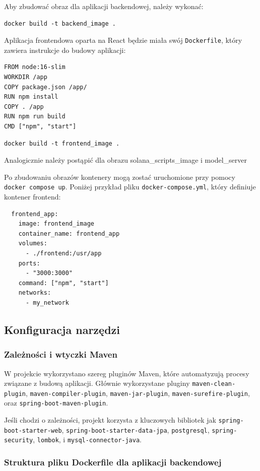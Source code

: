 Aby zbudować obraz dla aplikacji backendowej, należy wykonać:
\begin{lstlisting}
docker build -t backend_image .
\end{lstlisting}

Aplikacja frontendowa oparta na React będzie miała swój \texttt{Dockerfile}, który zawiera instrukcje do budowy aplikacji:
\begin{verbatim}
FROM node:16-slim
WORKDIR /app
COPY package.json /app/
RUN npm install
COPY . /app
RUN npm run build
CMD ["npm", "start"]
\end{verbatim}

\begin{lstlisting}
docker build -t frontend_image .
\end{lstlisting}

Analogicznie należy postąpić dla obrazu solana\_scripts\_image i model\_server

Po zbudowaniu obrazów kontenery mogą zostać uruchomione przy pomocy \texttt{docker compose up}. Poniżej przykład pliku \texttt{docker-compose.yml}, który definiuje kontener frontend:
\begin{verbatim}
  frontend_app:
    image: frontend_image
    container_name: frontend_app
    volumes:
      - ./frontend:/usr/app
    ports:
      - "3000:3000"
    command: ["npm", "start"]
    networks:
      - my_network
\end{verbatim}

\subsection{Konfiguracja narzędzi} 

\subsubsection{Zależności i wtyczki Maven}
W projekcie wykorzystano szereg pluginów Maven, które automatyzują procesy związane z budową aplikacji. Głównie wykorzystane pluginy \texttt{maven-clean-plugin}, \texttt{maven-compiler-plugin}, \texttt{maven-jar-plugin}, \texttt{maven-surefire-plugin}, oraz \texttt{spring-boot-maven-plugin}.

Jeśli chodzi o zależności, projekt korzysta z kluczowych bibliotek jak \texttt{spring-boot-starter-web}, \texttt{spring-boot-starter-data-jpa}, \texttt{postgresql}, \texttt{spring-security}, \texttt{lombok}, i \texttt{mysql-connector-java}.

\subsubsection{Struktura pliku Dockerfile dla aplikacji backendowej}

